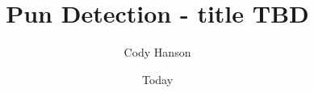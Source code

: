 \documentclass[]{article}
\begin{document}
\title{Pun Detection - title TBD}
\author{Cody Hanson}
\date{Today}
\maketitle







{}

\end{document}
